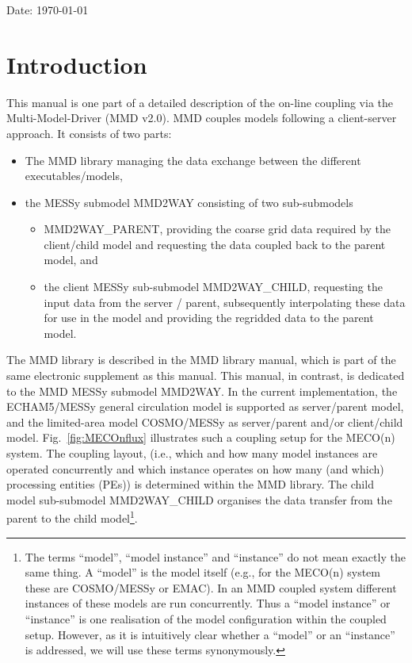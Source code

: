\documentclass[11pt,twoside]{article}
\begin{document}
\begin{center}
  Date: \today
\end{center}

\newpage %
\cleardoublepage

\sloppy

\tableofcontents
\clearpage


\section{Introduction}
This manual is one part of a detailed description of the on-line coupling via 
the Multi-Model-Driver (MMD v2.0). MMD couples models following a client-server approach.
It consists of two parts:
\begin{itemize}
\item The MMD library managing the data exchange between the different 
executables/models,
\item the MESSy submodel MMD2WAY consisting of two sub-submodels 
\begin{itemize}
 \item MMD2WAY\_PARENT, providing the coarse grid data required by the
 client/child model and requesting the data coupled back to the parent model,
 and 
\item the client MESSy sub-submodel MMD2WAY\_CHILD, requesting the input data from the 
server / parent, subsequently interpolating these data for use in the model
and providing the regridded data to the parent model.
\end{itemize}
\end{itemize}
The MMD library is described in the MMD library manual, which is part of 
the same electronic supplement as this manual. 
This manual, in contrast, is dedicated to the MMD MESSy submodel MMD2WAY.
In the current implementation, the ECHAM5/MESSy general circulation model is 
supported as server/parent model, and the limited-area model COSMO/MESSy as
server/parent and/or client/child model. Fig.\ \ref{fig:MECOnflux}
illustrates such a coupling setup for the MECO(n) system.
The coupling layout, (i.e., which and how many model instances
 are operated concurrently 
and which instance operates on how many (and which) processing
entities (PEs)) is  determined within the MMD library. The child model
sub-submodel 
MMD2WAY\_CHILD organises the data transfer from the parent to the child model\footnote{The terms ``model'', ``model instance''
and ``instance'' do not mean exactly the same thing. A ``model'' is
the model itself (e.g., for the MECO(n) system these are COSMO/MESSy
or EMAC). In an MMD coupled system different instances of these
models are run concurrently. Thus a ``model instance'' or ``instance''
is one realisation of the model configuration within the coupled setup.
However, as it is intuitively clear whether a ``model'' or an
``instance'' is addressed, we will use these terms synonymously.}.
\end{document}
